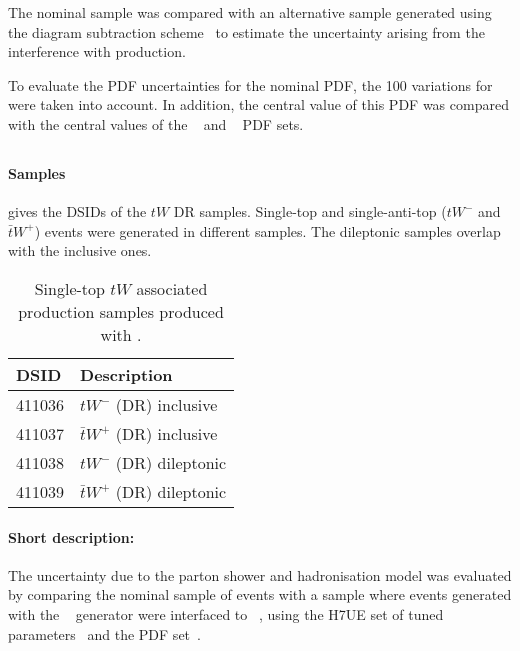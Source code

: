 

The nominal \POWPY[8] sample was compared with an alternative
sample generated using the diagram subtraction
scheme~\cite{Frixione:2008yi,ATL-PHYS-PUB-2016-020} to estimate the
uncertainty arising from the interference with \ttbar production.

To evaluate the PDF uncertainties for the nominal PDF, the 100
variations for \NNPDF[3.0nlo] were taken into account. 
In addition, the central value of this PDF was compared with the 
central values of the \CT[14nnlo]~\cite{Dulat:2015mca} and
\MMHT[nnlo]~\cite{Harland-Lang:2014zoa} PDF sets.


\subsection[Powheg+Herwig7]{\POWHER[7]}
\label{subsubsec:tW_PH7}

\paragraph{Samples}

 gives the DSIDs of the $tW$ \POWHER[7] DR samples.
Single-top and single-anti-top ($tW^-$ and $\bar{t}W^+$) events were generated in different samples.
The dileptonic samples overlap with the inclusive ones.

\begin{table}[htbp]
  \caption{Single-top $tW$ associated production samples produced with \POWHER[7].}%
  \label{tab:tW_PH7}
  \centering
  \begin{tabular}{l l}
    \toprule
    DSID & Description \\
    \midrule
    411036 & $tW^-$ (DR) inclusive \\
    411037 & $\bar{t}W^+$ (DR) inclusive \\
    411038 & $tW^-$ (DR) dileptonic \\
    411039 & $\bar{t}W^+$ (DR) dileptonic \\
    \bottomrule
  \end{tabular}
\end{table}

\paragraph{Short description:}

The uncertainty due to the parton shower and hadronisation model was
evaluated by comparing the nominal sample of events with a sample where
events generated with the
\POWHEGBOX[v2]~\cite{Re:2010bp,Nason:2004rx,Frixione:2007vw,Alioli:2010xd}
generator were interfaced to
\HERWIG[7.04]~\cite{Bahr:2008pv,Bellm:2015jjp}, using the H7UE set
of tuned parameters~\cite{Bellm:2015jjp} and the \MMHT[lo] PDF set~\cite{Harland-Lang:2014zoa}.


